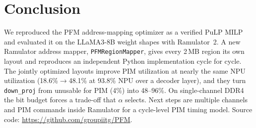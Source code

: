 \documentclass[conference]{IEEEtran}
\begin{document}
\section{Conclusion}
We reproduced the PFM address-mapping optimizer as a verified PuLP MILP and evaluated it on the LLaMA3-8B weight shapes with Ramulator~2. A new Ramulator address mapper, \texttt{PFMRegionMapper}, gives every 2\,MB region its own layout and reproduces an independent Python implementation cycle for cycle. The jointly optimized layouts improve PIM utilization at nearly the same NPU utilization (18.6\%$\rightarrow$48.1\% at 93.8\% NPU over a decoder layer), and they turn \texttt{down\_proj} from unusable for PIM (4\%) into 48--96\%. On single-channel DDR4 the bit budget forces a trade-off that $\alpha$ selects. Next steps are multiple channels and PIM commands inside Ramulator for a cycle-level PIM timing model. Source code: \url{https://github.com/groupiitg/PFM}.



\end{document}

